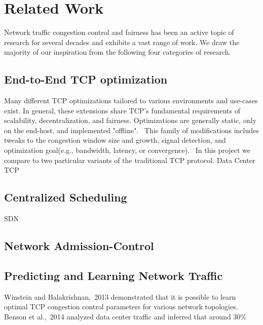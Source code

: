 \section{Related Work}
\label{sec:related}
Network traffic congestion control and fairness has been an active topic of 
research for several decades and exhibits a vast range of work. We draw the 
majority of our inspiration from the following four categories of research.
\subsection{End-to-End TCP optimization}
Many different TCP optimizations tailored to various environments and use-cases 
exist. In general, these extensions share TCP's fundamental requirements of 
scalability, decentralization, and fairness. Optimizations are generally 
static, only on the end-host, and implemented "offline".~\cite{throwdown} This 
family of modifications includes tweaks to the congestion window size and 
growth, signal detection, and optimization goal(e.g., bandwidth, latency, or 
convergence).~\cite{tcp_family}
In this project we compare to two particular variants of the traditional TCP 
protocol. Data Center TCP~\cite{dctcp}  

\subsection{Centralized Scheduling}
SDN
\subsection{Network Admission-Control}
\subsection{Predicting and Learning Network Traffic}
Winstein and Balakrishnan,~2013\cite{remy} demonstrated that it is possible to 
learn optimal TCP congestion control parameters for various network 
topologies. 
Benson et al.,~2014\cite{microte} analyzed data center traffic and inferred 
that around 30\% 
